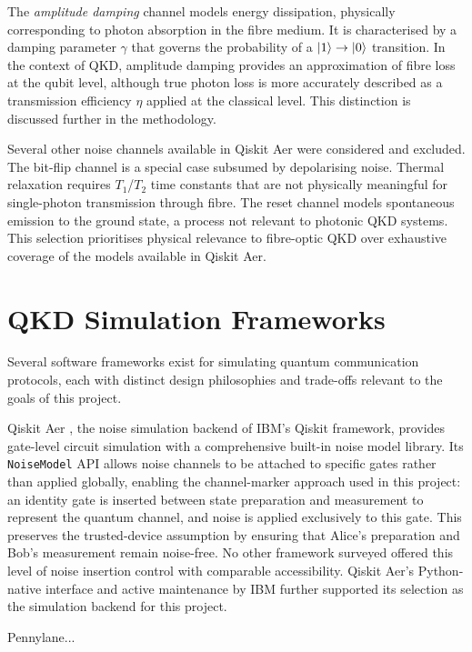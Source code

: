\documentclass[10pt, a4paper]{report}
\begin{document}
The \textit{amplitude damping} channel models energy dissipation, physically corresponding to photon absorption in the fibre medium. It is characterised by a damping parameter $\gamma$ that governs the probability of a $\ket{1} \rightarrow \ket{0}$ transition. In the context of QKD, amplitude damping provides an approximation of fibre loss at the qubit level, although true photon loss is more accurately described as a transmission efficiency $\eta$ applied at the classical level. This distinction is discussed further in the methodology.

Several other noise channels available in Qiskit Aer were considered and excluded. The bit-flip channel is a special case subsumed by depolarising noise. Thermal relaxation requires $T_1$/$T_2$ time constants that are not physically meaningful for single-photon transmission through fibre. The reset channel models spontaneous emission to the ground state, a process not relevant to photonic QKD systems. This selection prioritises physical relevance to fibre-optic QKD over exhaustive coverage of the models available in Qiskit Aer.


\section{QKD Simulation Frameworks}

Several software frameworks exist for simulating quantum communication protocols, each with distinct design philosophies and trade-offs relevant to the goals of this project.

Qiskit Aer \cite{QiskitAer}, the noise simulation backend of IBM's Qiskit framework, provides gate-level circuit simulation with a comprehensive built-in noise model library. Its \texttt{NoiseModel} API allows noise channels to be attached to specific gates rather than applied globally, enabling the channel-marker approach used in this project: an identity gate is inserted between state preparation and measurement to represent the quantum channel, and noise is applied exclusively to this gate. This preserves the trusted-device assumption by ensuring that Alice's preparation and Bob's measurement remain noise-free. No other framework surveyed offered this level of noise insertion control with comparable accessibility. Qiskit Aer's Python-native interface and active maintenance by IBM further supported its selection as the simulation backend for this project.

Pennylane...
\end{document}
